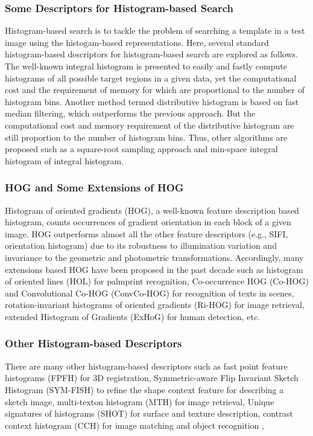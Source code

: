 \documentclass{article}
\begin{document}
\subsubsection{Some Descriptors for Histogram-based Search}
Histogram-based search is to tackle the problem of searching a template in a test image using the histogam-based representations. Here, several standard histogram-based descriptors for histogram-based search are explored as follows.\\ 
The well-known integral histogram is presented to easily and fastly compute histograms of all possible target regions in a given data, yet the computational cost and the requirement of memory for which are proportional to the number of histogram bins\cite{Porikli2005}. Another method termed distributive histogram is based on fast median filtering, which outperforms the previous approach\cite{M.SizintsevK.G.Derpanis2008}. But the computational cost and memory requirement of the distributive histogram are still proportion to the number of histogram bins. Thus, other algorithms are proposed such as a square-root sampling approach\cite{Chang2010} and min-space integral histogram of integral histogram\cite{Dubuisson2012}.
\subsubsection{HOG and Some Extensions of HOG}
Histogram of oriented gradients (HOG), a well-known feature description based histogram, counts occurrences of gradient orientation in each block of a given image. HOG outperforms almost all the other feature descriptors (e.g., SIFI, orientation histogram\cite{Freeman1995}) due to its robustness to illumination variation and invariance to the geometric and photometric transformations. Accordingly, many extensions based HOG have been proposed in the past decade such as histogram of oriented lines (HOL) for palmprint recognition\cite{Jia2014}, Co-occurrence HOG (Co-HOG) and Convolutional Co-HOG (ConvCo-HOG) for recognition of texts in scenes\cite{Tian2015}, rotation-invariant histograms of oriented gradients (Ri-HOG) for image retrieval\cite{Chen2015}, extended Histogram of Gradients (ExHoG) for human detection\cite{Satpathy2014}, etc. 
\subsubsection{Other Histogram-based Descriptors}
There are many other histogram-based descriptors such as fast point feature histograms (FPFH) for 3D registration\cite{Rusu}, Symmetric-aware Flip Invariant Sketch Histogram (SYM-FISH) to refine the shape context feature for describing a sketch image\cite{Cao2013}, multi-texton histogram (MTH) for image retrieval\cite{Liu2010}, 
Unique signatures of histograms (SHOT) for surface and texture description\cite{Salti2014}, contrast context histogram (CCH) for image matching and object recognition
\cite{Huang2008},
\end{document}
